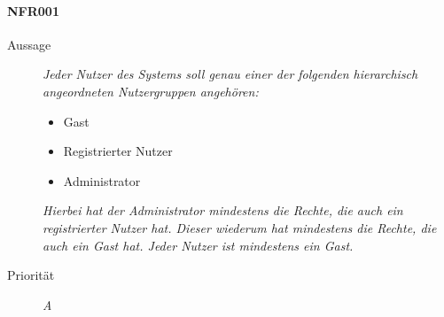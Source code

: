 \paragraph{NFR001}
\begin{description}
  \item[Aussage] \textit{Jeder Nutzer des Systems soll genau einer der folgenden hierarchisch angeordneten Nutzergruppen angeh\"oren:}
           \begin{itemize}
	      \item Gast
	      \item Registrierter Nutzer
	      \item Administrator
   	   \end{itemize}
	\textit{Hierbei hat der Administrator mindestens die Rechte, die auch ein registrierter Nutzer hat. Dieser wiederum hat mindestens die Rechte, die auch ein Gast hat. Jeder Nutzer ist mindestens ein Gast.}
  \item[Priorit\"at] \textit{A}
\end{description}